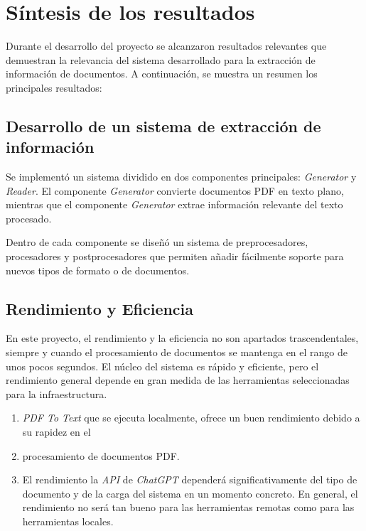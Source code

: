 \section{Síntesis de los resultados}

Durante el desarrollo del proyecto se alcanzaron resultados relevantes que demuestran la relevancia del sistema
desarrollado para la extracción de información de documentos.
A continuación, se muestra un resumen los principales resultados:

\subsection*{Desarrollo de un sistema de extracción de información}

Se implementó un sistema dividido en dos componentes principales: \textit{Generator} y \textit{Reader}.
El componente \textit{Generator} convierte documentos PDF en texto plano, mientras que el componente \textit{Generator}
extrae información relevante del texto procesado.

Dentro de cada componente se diseñó un sistema de preprocesadores, procesadores y postprocesadores que permiten
añadir fácilmente soporte para nuevos tipos de formato o de documentos.

\subsection*{Rendimiento y Eficiencia}

En este proyecto, el rendimiento y la eficiencia no son apartados trascendentales, siempre y cuando el procesamiento de
documentos se mantenga en el rango de unos pocos segundos.
El núcleo del sistema es rápido y eficiente, pero el rendimiento general depende en gran medida de las herramientas
seleccionadas para la infraestructura.

\begin{enumerate}
    \item \textit{PDF To Text} que se ejecuta localmente, ofrece un buen rendimiento debido a su rapidez en el
    \item procesamiento de documentos PDF.
    \item El rendimiento la \textit{API} de \textit{ChatGPT} dependerá significativamente del tipo de documento y de la
    carga del sistema en un momento concreto.
    En general, el rendimiento no será tan bueno para las herramientas remotas como para las herramientas locales.
\end{enumerate}


